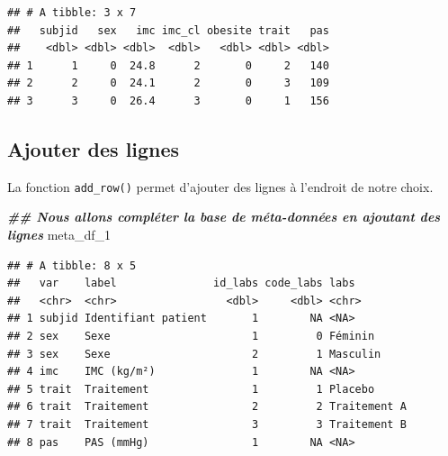 \documentclass[
]{book}
\newenvironment{Shaded}{\begin{snugshade}}{\end{snugshade}}
\newcommand{\DocumentationTok}[1]{\textcolor[rgb]{0.56,0.35,0.01}{\textbf{\textit{#1}}}}
\newcommand{\NormalTok}[1]{#1}
\begin{document}
\begin{verbatim}
## # A tibble: 3 x 7
##   subjid   sex   imc imc_cl obesite trait   pas
##    <dbl> <dbl> <dbl>  <dbl>   <dbl> <dbl> <dbl>
## 1      1     0  24.8      2       0     2   140
## 2      2     0  24.1      2       0     3   109
## 3      3     0  26.4      3       0     1   156
\end{verbatim}

\subsection{Ajouter des lignes}\label{ajouter-des-lignes}

La fonction \texttt{add\_row()} permet d'ajouter des lignes à l'endroit de notre choix.

\begin{Shaded}
\begin{Highlighting}[]
\DocumentationTok{\#\# Nous allons compléter la base de méta{-}données en ajoutant des lignes}
\NormalTok{meta\_df\_1}
\end{Highlighting}
\end{Shaded}

\begin{verbatim}
## # A tibble: 8 x 5
##   var    label               id_labs code_labs labs        
##   <chr>  <chr>                 <dbl>     <dbl> <chr>       
## 1 subjid Identifiant patient       1        NA <NA>        
## 2 sex    Sexe                      1         0 Féminin     
## 3 sex    Sexe                      2         1 Masculin    
## 4 imc    IMC (kg/m²)               1        NA <NA>        
## 5 trait  Traitement                1         1 Placebo     
## 6 trait  Traitement                2         2 Traitement A
## 7 trait  Traitement                3         3 Traitement B
## 8 pas    PAS (mmHg)                1        NA <NA>
\end{verbatim}
\end{document}

